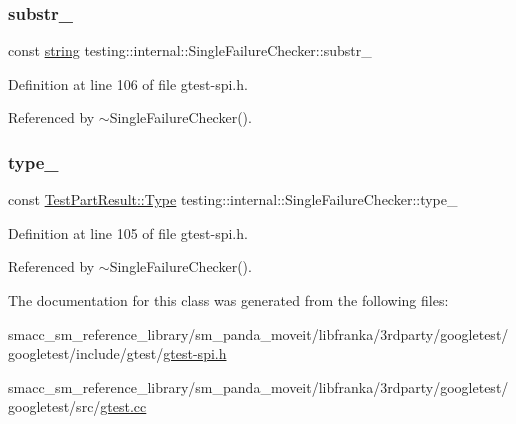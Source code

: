 \subsubsection{\texorpdfstring{substr\+\_\+}{substr\_}}
{\footnotesize\ttfamily const \hyperlink{namespacetesting_1_1internal_a8e8ff5b11e64078831112677156cb111}{string} testing\+::internal\+::\+Single\+Failure\+Checker\+::substr\+\_\+\hspace{0.3cm}{\ttfamily [private]}}



Definition at line 106 of file gtest-\/spi.\+h.



Referenced by $\sim$\+Single\+Failure\+Checker().

\mbox{\label{classtesting_1_1internal_1_1SingleFailureChecker_a8fc33138c357b2a6ede3698eb57548a7}} 
\subsubsection{\texorpdfstring{type\+\_\+}{type\_}}
{\footnotesize\ttfamily const \hyperlink{classtesting_1_1TestPartResult_a65ae656b33fdfdfffaf34858778a52d5}{Test\+Part\+Result\+::\+Type} testing\+::internal\+::\+Single\+Failure\+Checker\+::type\+\_\+\hspace{0.3cm}{\ttfamily [private]}}



Definition at line 105 of file gtest-\/spi.\+h.



Referenced by $\sim$\+Single\+Failure\+Checker().



The documentation for this class was generated from the following files\+:\begin{DoxyCompactItemize}
\item 
smacc\+\_\+sm\+\_\+reference\+\_\+library/sm\+\_\+panda\+\_\+moveit/libfranka/3rdparty/googletest/googletest/include/gtest/\hyperlink{gtest-spi_8h}{gtest-\/spi.\+h}\item 
smacc\+\_\+sm\+\_\+reference\+\_\+library/sm\+\_\+panda\+\_\+moveit/libfranka/3rdparty/googletest/googletest/src/\hyperlink{gtest_8cc}{gtest.\+cc}\end{DoxyCompactItemize}
